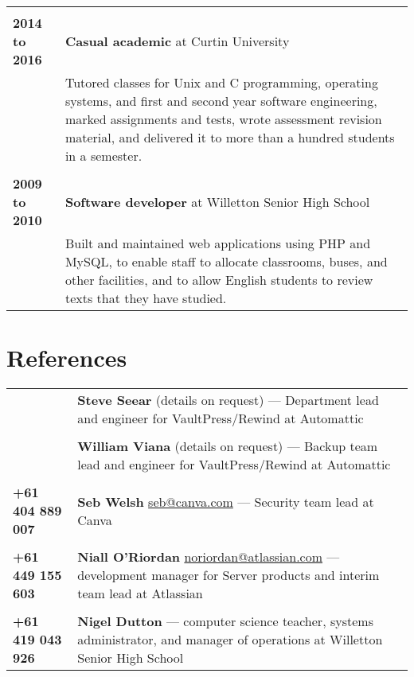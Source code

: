 \documentclass[a4paper,12pt]{article}
\begin{document}
\begin{tabular}{p{35mm}p{125mm}}
	\\              \\  \textbf{2014 to 2016}       & \textbf{Casual academic} at Curtin University
	\vspace{0.2em}  \\                              & Tutored classes for Unix and C programming, operating systems, and first and second year software engineering, marked assignments and tests, wrote assessment revision material, and delivered it to more than a hundred students in a semester.
	\\              \\  \textbf{2009 to 2010}       & \textbf{Software developer} at Willetton Senior High School
	\vspace{0.2em}  \\                              & Built and maintained web applications using PHP and MySQL, to enable staff to allocate classrooms, buses, and other facilities, and to allow English students to review texts that they have studied.
\end{tabular}

\section*{References}

\begin{tabular}{p{35mm}p{125mm}}
	                                                & \textbf{Steve Seear} (details on request) --- Department lead and engineer for VaultPress/Rewind at Automattic
	\\              \\                              & \textbf{William Viana} (details on request) --- Backup team lead and engineer for VaultPress/Rewind at Automattic
	\\              \\  \textbf{+61 404 889 007}    & \textbf{Seb Welsh} \textlangle{}\href{mailto:seb@canva.com}{seb@canva.com}\textrangle{} --- Security team lead at Canva
	\\              \\  \textbf{+61 449 155 603}    & \textbf{Niall O’Riordan} \textlangle{}\href{mailto:noriordan@atlassian.com}{noriordan@atlassian.com}\textrangle{} --- development manager for Server products and interim team lead at Atlassian
	\\              \\  \textbf{+61 419 043 926}    & \textbf{Nigel Dutton} --- computer science teacher, systems administrator, and manager of operations at Willetton Senior High School
\end{tabular}
\end{document}
